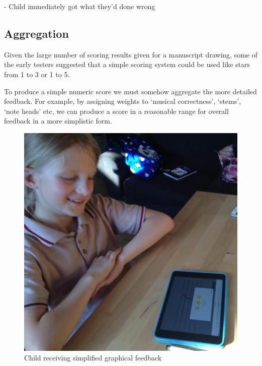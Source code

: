 - Child immediately got what they'd done wrong

\subsection{Aggregation}
Given the large number of scoring results given for a manuscript drawing, some of the early testers suggested that a simple scoring system could be used like stars from 1 to 3 or 1 to 5.

To produce a simple numeric score we must somehow aggregate the more detailed feedback. For example, by assigning weights to `musical correctness', `stems', `note heads' etc, we can produce a score in a reasonable range for overall feedback in a more simplistic form.

\begin{figure}[H]
  \includegraphics[width=\linewidth]{gfx/photos/user-receiving-feedback.jpg}
  \caption{Child receiving simplified graphical feedback}
\end{figure}
